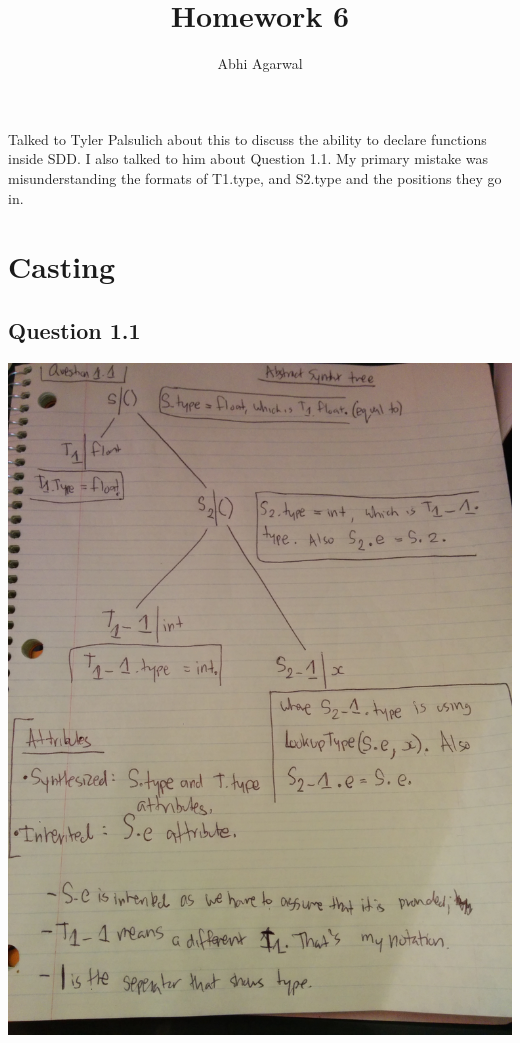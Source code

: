 \documentclass[11pt, oneside]{article}   	%
\title{Homework 6}
\author{Abhi Agarwal}
\date{}
\begin{document}
\maketitle

\par Talked to Tyler Palsulich about this to discuss the ability to declare functions inside SDD. I also talked to him about Question 1.1. My primary mistake was misunderstanding the formats of T1.type, and S2.type and the positions they go in.

\section{Casting}
\subsection*{Question 1.1}
\includegraphics[scale=0.19]{IMG_20141011_142752.jpg}

\newpage
\end{document}
